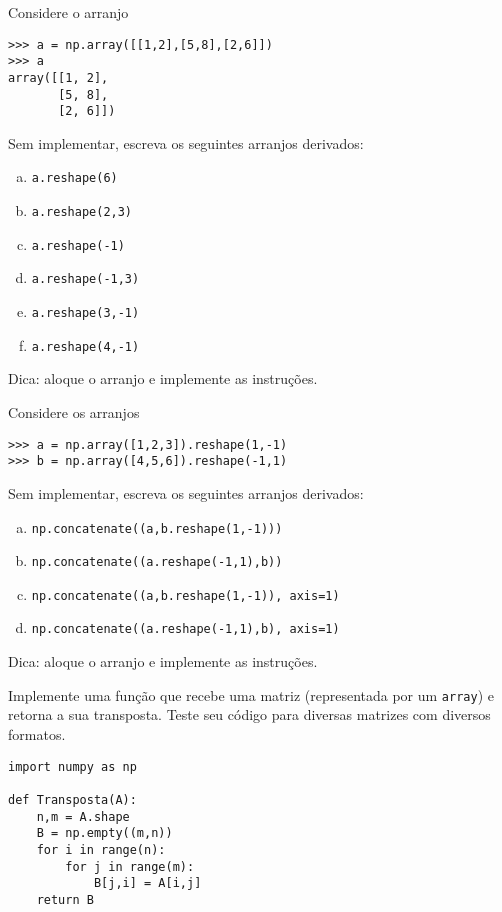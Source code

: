 \begin{exer}
  Considere o arranjo

\begin{lstlisting}
>>> a = np.array([[1,2],[5,8],[2,6]])
>>> a
array([[1, 2],
       [5, 8],
       [2, 6]])
\end{lstlisting}

Sem implementar, escreva os seguintes arranjos derivados:
  \begin{enumerate}[a)]
  \item \lstinline+a.reshape(6)+
  \item \lstinline+a.reshape(2,3)+
  \item \lstinline+a.reshape(-1)+
  \item \lstinline+a.reshape(-1,3)+
  \item \lstinline+a.reshape(3,-1)+
  \item \lstinline+a.reshape(4,-1)+
  \end{enumerate}
\end{exer}
\begin{resp}
  Dica: aloque o arranjo e implemente as instruções.
\end{resp}

\begin{exer}
  Considere os arranjos

\begin{lstlisting}
>>> a = np.array([1,2,3]).reshape(1,-1)
>>> b = np.array([4,5,6]).reshape(-1,1)
\end{lstlisting}

Sem implementar, escreva os seguintes arranjos derivados:
  \begin{enumerate}[a)]
  \item \lstinline+np.concatenate((a,b.reshape(1,-1)))+
  \item \lstinline+np.concatenate((a.reshape(-1,1),b))+
  \item \lstinline+np.concatenate((a,b.reshape(1,-1)), axis=1)+
  \item \lstinline+np.concatenate((a.reshape(-1,1),b), axis=1)+
  \end{enumerate}
\end{exer}
\begin{resp}
  Dica: aloque o arranjo e implemente as instruções.
\end{resp}

\begin{exer}
  Implemente uma função que recebe uma matriz (representada por um \lstinline+array+) e retorna a sua transposta. Teste seu código para diversas matrizes com diversos formatos.
\end{exer}
\begin{resp}

\begin{lstlisting}
import numpy as np

def Transposta(A):
    n,m = A.shape
    B = np.empty((m,n))
    for i in range(n):
        for j in range(m):
            B[j,i] = A[i,j]
    return B
\end{lstlisting}

\end{resp}

